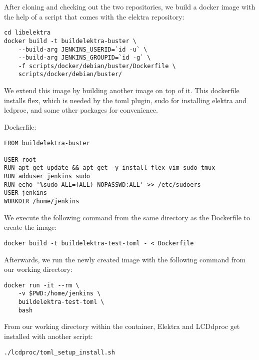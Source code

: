 \documentclass[12pt]{report}
\begin{document}
After cloning and checking out the two repositories, we build a docker image with the help of a script that comes with the elektra repository:
\begin{tcolorbox}
\begin{verbatim}
cd libelektra
docker build -t buildelektra-buster \
    --build-arg JENKINS_USERID=`id -u` \
    --build-arg JENKINS_GROUPID=`id -g` \
    -f scripts/docker/debian/buster/Dockerfile \
    scripts/docker/debian/buster/
\end{verbatim}
\end{tcolorbox}

We extend this image by building another image on top of it. This dockerfile installs flex, which is needed by the toml plugin, sudo for installing elektra and lcdproc, and some other packages for convenience.

Dockerfile:
\begin{tcolorbox}
\small
\begin{verbatim}
FROM buildelektra-buster

USER root
RUN apt-get update && apt-get -y install flex vim sudo tmux
RUN adduser jenkins sudo
RUN echo '%sudo ALL=(ALL) NOPASSWD:ALL' >> /etc/sudoers
USER jenkins
WORKDIR /home/jenkins
\end{verbatim}
\end{tcolorbox}

We execute the following command from the same directory as the Dockerfile to create the image:
\begin{tcolorbox}
\small
\begin{verbatim}
docker build -t buildelektra-test-toml - < Dockerfile
\end{verbatim}
\end{tcolorbox}

Afterwards, we run the newly created image with the following command from our working directory:
\begin{tcolorbox}
\small
\begin{verbatim}
docker run -it --rm \
    -v $PWD:/home/jenkins \
    buildelektra-test-toml \
    bash
\end{verbatim}
\end{tcolorbox}

From our working directory within the container, Elektra and LCDdproc get installed with another script:
\begin{tcolorbox}
\small
\begin{verbatim}
./lcdproc/toml_setup_install.sh
\end{verbatim}
\end{tcolorbox}
\end{document}
